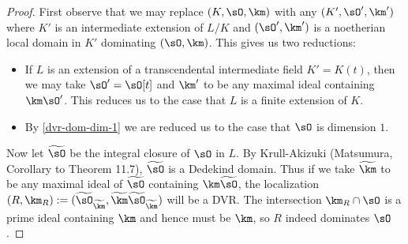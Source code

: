 \begin{nothing}
\begin{subproposition}
    \begin{proof}
      First observe that we may replace $(K,\sO,\km)$ with any $(K',\sO',\km')$ where $K'$ is an intermediate extension of $L/K$ and $(\sO',\km')$ is a noetherian local domain in $K'$ dominating $(\sO,\km)$. This gives us two reductions:
      \begin{itemize}
      \item If $L$ is an extension of a transcendental intermediate field $K' = K(t)$, then we may take $\sO' = \sO[t]$ and $\km'$ to be any maximal ideal containing $\km\sO'$. This reduces us to the case that $L$ is a finite extension of $K$.
      \item By \cref{dvr-dom-dim-1} we are reduced us to the case that $\sO$ is dimension $1$.
      \end{itemize}
      
      Now let $\til\sO$ be the integral closure of $\sO$ in $L$. By Krull-Akizuki (Matsumura, Corollary to Theorem 11.7), $\til\sO$ is a Dedekind domain. Thus if we take $\til\km$ to be any maximal ideal of $\til\sO$ containing $\km\til\sO$, the localization $(R,\km_R) \ce (\til\sO_{\til\km},\til\km\til\sO_{\til\km})$ will be a DVR. The intersection $\km_R \cap \sO$ is a prime ideal containing $\km$ and hence must be $\km$, so $R$ indeed dominates $\sO$.
    \end{proof}
  \end{subproposition}
\end{nothing}


